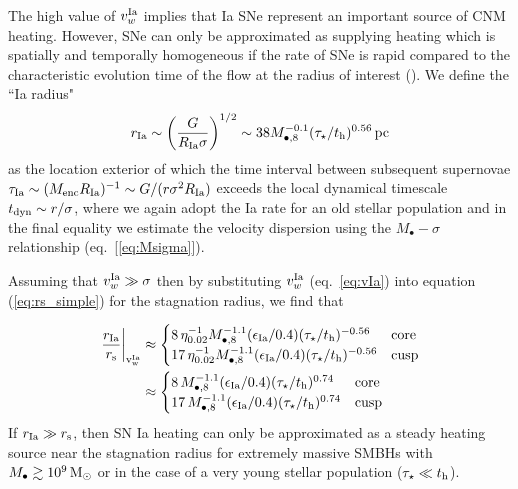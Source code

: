 \documentclass[usenatbib,fleqn]{mn2e}
\begin{document}
The high value of $v_{w}^{\rm Ia}$ implies that Ia SNe represent an
important source of CNM heating.  However, SNe can only be
approximated as supplying heating which is spatially and temporally
homogeneous if the rate of SNe is rapid compared to the characteristic
evolution time of the flow at the radius of interest
(\citealt{ShcherbakovWong+:2014a}).  We define the ``Ia radius"
  \begin{align}
    r_{\rm Ia} \sim \left(\frac{G}{R_{\rm Ia}\sigma}\right)^{1/2} \sim
    38 M_{\bullet,8}^{-0.1}(\tau_{\star}/t_{\rm h})^{0.56}\,{\rm pc}
    \label{eq:rIa}
  \end{align}
  as the location exterior of which the time interval between
  subsequent supernovae $\tau_{\rm Ia} \sim (M_{\rm enc}R_{\rm
    Ia})^{-1} \sim G/(r\sigma^{2}R_{\rm Ia})$ exceeds the local
  dynamical timescale $t_{\rm dyn} \sim r/\sigma$, where we again
  adopt the Ia rate for an old stellar population and in the final
  equality we estimate the velocity dispersion using the
  $M_{\bullet}-\sigma$ relationship (eq.~[\ref{eq:Msigma}]).

Assuming that $v_{w}^{\rm Ia} \gg \sigma$ then by substituting
$v_{w}^{\rm Ia}$ (eq.~\ref{eq:vIa}) into equation (\ref{eq:rs_simple})
for the stagnation radius, we find that

\begin{align}
  \left.\frac{r_{\rm Ia}}{r_{\rm s}}\right|_{\rm v_{w}^{\rm Ia}}&\approx
  \begin{cases}
    8\, \eta_{0.02}^{-1} M_{\bullet,8}^{-1.1}(\epsilon_{\rm
     Ia}/0.4) (\tau_{\star}/t_{\rm h})^{-0.56}  & {\rm core}\\
    17\, \eta_{0.02}^{-1} M_{\bullet,8}^{-1.1}(\epsilon_{\rm
     Ia}/0.4) (\tau_{\star}/t_{\rm h})^{-0.56} &{\rm cusp}\\
   \end{cases} \nonumber\\
 &\approx 
 \begin{cases}
    8\, M_{\bullet,8}^{-1.1}(\epsilon_{\rm
     Ia}/0.4) (\tau_{\star}/t_{\rm h})^{0.74}  & {\rm core}\\
    17\, M_{\bullet,8}^{-1.1}(\epsilon_{\rm
     Ia}/0.4) (\tau_{\star}/t_{\rm h})^{0.74} &{\rm cusp}\\
   \end{cases}
\label{eq:rIars}
\end{align}
If $r_{\rm Ia} \gg r_{\rm s}$, then SN Ia heating can only be
approximated as a steady heating source near the stagnation radius for
extremely massive SMBHs with $M_{\bullet} \gtrsim 10^9 \,{\rm M_\odot}$ or in
the case of a very young stellar population ($\tau_{\star} \ll t_{\rm
h}$).  
\end{document}
